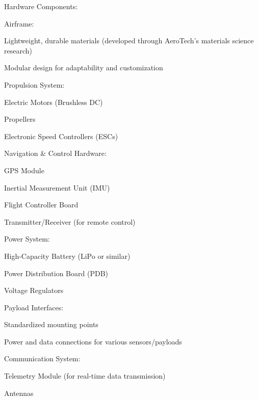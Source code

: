 Hardware Components:

Airframe:

Lightweight, durable materials (developed through AeroTech's materials science research)

Modular design for adaptability and customization

Propulsion System:

Electric Motors (Brushless DC)

Propellers

Electronic Speed Controllers (ESCs)

Navigation \& Control Hardware:

GPS Module

Inertial Measurement Unit (IMU)

Flight Controller Board

Transmitter/Receiver (for remote control)

Power System:

High-Capacity Battery (LiPo or similar)

Power Distribution Board (PDB)

Voltage Regulators

Payload Interfaces:

Standardized mounting points

Power and data connections for various sensors/payloads

Communication System:

Telemetry Module (for real-time data transmission)

Antennas

